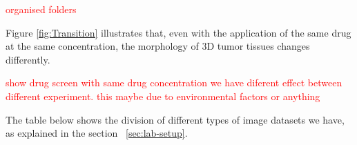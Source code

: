 \textcolor{red}{organised folders}


Figure \ref{fig:Transition} illustrates that, even with the application of the same drug at the same concentration, the morphology of 3D tumor tissues changes differently.

\textcolor{red}{ show drug screen with same drug concentration we have diferent effect between different experiment. this maybe due to environmental 
factors or anything}

The table below shows the division of different types of image datasets we have, as  explained in the section ~\ref{sec:lab-setup}.
\begin{table}[ht!]
  \centering
  \caption{Dataset Class Overview}
  \label{tab:dataset}
\end{table}



